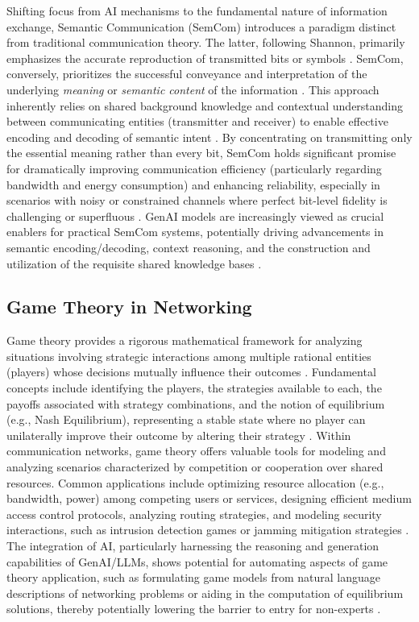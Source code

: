\documentclass[sigconf]{acmart}
\begin{document}
Shifting focus from AI mechanisms to the fundamental nature of information exchange, Semantic Communication (SemCom) introduces a paradigm distinct from traditional communication theory. The latter, following Shannon, primarily emphasizes the accurate reproduction of transmitted bits or symbols \cite{ref22, ref23, ref24}. SemCom, conversely, prioritizes the successful conveyance and interpretation of the underlying \textit{meaning} or \textit{semantic content} of the information \cite{ref22, ref23, ref24}. This approach inherently relies on shared background knowledge and contextual understanding between communicating entities (transmitter and receiver) to enable effective encoding and decoding of semantic intent \cite{ref23}. By concentrating on transmitting only the essential meaning rather than every bit, SemCom holds significant promise for dramatically improving communication efficiency (particularly regarding bandwidth and energy consumption) and enhancing reliability, especially in scenarios with noisy or constrained channels where perfect bit-level fidelity is challenging or superfluous \cite{ref22, ref23, ref24}. GenAI models are increasingly viewed as crucial enablers for practical SemCom systems, potentially driving advancements in semantic encoding/decoding, context reasoning, and the construction and utilization of the requisite shared knowledge bases \cite{ref22, ref24}.

\subsection{Game Theory in Networking}

Game theory provides a rigorous mathematical framework for analyzing situations involving strategic interactions among multiple rational entities (players) whose decisions mutually influence their outcomes \cite{ref21}. Fundamental concepts include identifying the players, the strategies available to each, the payoffs associated with strategy combinations, and the notion of equilibrium (e.g., Nash Equilibrium), representing a stable state where no player can unilaterally improve their outcome by altering their strategy \cite{ref21}. Within communication networks, game theory offers valuable tools for modeling and analyzing scenarios characterized by competition or cooperation over shared resources. Common applications include optimizing resource allocation (e.g., bandwidth, power) among competing users or services, designing efficient medium access control protocols, analyzing routing strategies, and modeling security interactions, such as intrusion detection games or jamming mitigation strategies \cite{ref21}. The integration of AI, particularly harnessing the reasoning and generation capabilities of GenAI/LLMs, shows potential for automating aspects of game theory application, such as formulating game models from natural language descriptions of networking problems or aiding in the computation of equilibrium solutions, thereby potentially lowering the barrier to entry for non-experts \cite{ref21}.
\end{document}
